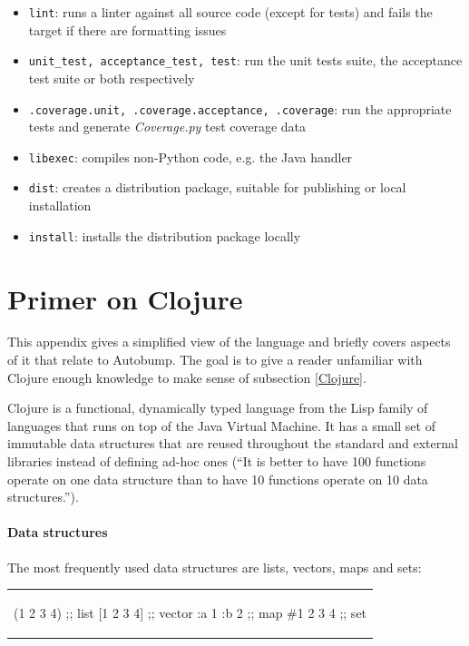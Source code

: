 \documentclass{l4proj}
\newcommand\genericstyle{\lstset{basicstyle=\ttm}}
\newcommand\codeinline[1]{{\genericstyle\lstinline!#1!}}
\begin{document}
\begin{appendices}
\begin{itemize}
\item \codeinline{lint}: runs a linter against all source code (except
for tests) and fails the target if there are formatting issues
\item \codeinline{unit_test, acceptance_test, test}: run the unit
tests suite, the acceptance test suite or both respectively
\item \codeinline{.coverage.unit, .coverage.acceptance, .coverage}:
run the appropriate tests and generate \textit{Coverage.py}
\cite{Coverage} test coverage data
\item \codeinline{libexec}: compiles non-Python code, e.g. the Java handler
\item \codeinline{dist}: creates a distribution package, suitable for
publishing or local installation
\item \codeinline{install}: installs the distribution package locally
\end{itemize}

\chapter{Primer on Clojure}
\label{ClojurePrimer}

This appendix gives a simplified view of the language and briefly
covers aspects of it that relate to Autobump. The goal is to give a
reader unfamiliar with Clojure enough knowledge to make sense of
subsection \ref{Clojure}.

Clojure is a functional, dynamically typed language from the Lisp
family of languages that runs on top of the Java Virtual Machine. It
has a small set of immutable data structures that are reused
throughout the standard and external libraries instead of defining
ad-hoc ones (``It is better to have 100 functions operate on one data
structure than to have 10 functions operate on 10 data
structures.''\cite{ClojureRationale}).

\subsubsection{Data structures}

The most frequently used data structures are lists, vectors, maps and
sets:

\begin{center}
\begin{tabular}{c}
\begin{clojure}
(1 2 3 4)    ;; list
[1 2 3 4]    ;; vector
{:a 1 :b 2}  ;; map
#{1 2 3 4}   ;; set
\end{clojure}
\end{tabular}
\end{center}


\end{appendices}
\end{document}
